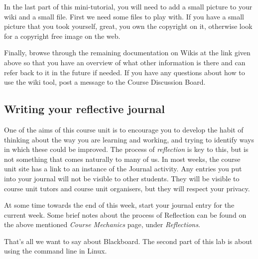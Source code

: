 \begin{firstonly}
In the last part of this mini-tutorial, you will need to add a small
picture to your wiki and a small file. First we need some files to
play with. If you have a small picture that you took yourself, great,
you own the copyright on it, otherwise look for a copyright free image
on the web.

Finally, browse through the remaining documentation on Wikis at the
link given above so that you have an overview of what other
information is there and can refer back to it in the future if
needed. If you have any questions about how to use the wiki tool, post
a message to the Course Discussion Board.


\subsection{Writing your reflective journal}
\label{sec:writing-your-journal}

One of the aims of this course unit is to encourage you to develop the
habit of thinking about the way you are learning and working, and
trying to identify ways in which these could be improved. The process
of \emph{reflection} is key to this, but is not something that comes
naturally to many of us. In most weeks, the course unit site
has a link to an instance of the Journal activity. Any entries you put
into your journal will not be visible to other students. They will be
visible to course unit tutors and course unit organisers, but they
will respect your privacy. 

At some time towards the end of this week, start your journal entry
for the current week. Some brief notes about the process of Reflection
can be found on the above mentioned \emph{Course Mechanics} page,
under \emph{Reflections}. 

That's all we want to say about Blackboard. The second part of this
lab is about using the command line in Linux.
  
\end{firstonly}

